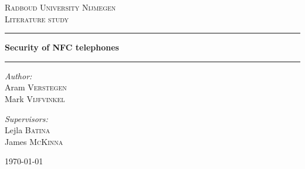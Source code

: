 \begin{titlepage}
\begin{center}
\textsc{\LARGE Radboud University Nijmegen}\\[1.5cm]
\textsc{\Large Literature study}\\[1.5cm]
\hrule \vspace{0.4cm}
{\huge \bfseries Security of NFC telephones } \\[0.4cm]
\hrule \vspace{1.5cm}

\vspace{2.5cm}
\begin{minipage}{0.4\textwidth}
\begin{flushleft} \large
\emph{Author:}\\
Aram \textsc{Verstegen} \\
Mark \textsc{Vijfvinkel}
\vspace{0.57cm}
\end{flushleft}
\end{minipage}
\begin{minipage}{0.4\textwidth}
\begin{flushright} \large
\emph{Supervisors:} \\
Lejla \textsc{Batina} \\
James \textsc{McKinna}
\end{flushright}
\end{minipage}

 
\vfill

{\large \today}

\end{center}
\end{titlepage}
